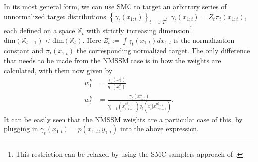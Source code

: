 In its most general form, we can use SMC to target an arbitrary
series of unnormalized target distributions $\left\{\gamma_t (x_{1:t})\right\}_{t=1:T}, \; 
\gamma_t (x_{1:t}) = Z_t \pi_t (x_{1:t})$, each defined on a space
$\mathbb{X}_t$ with strictly increasing dimension\footnote{This restriction
	can be relaxed by using the SMC samplers approach of \citet{del2006sequential}.}
$\mathrm{dim}(\mathbb{X}_{t-1})<\mathrm{dim}(\mathbb{X}_{t})$.
Here $Z_t := \int \gamma_t(x_{1:t}) dx_{1:t}$ is the normalization constant and $\pi_t (x_{1:t})$
the corresponding normalized target.  
The only difference that needs to be made from the NMSSM case is in how the weights
are calculated, with them now given by
\begin{subequations}
\label{eq:part:smc-arb-weights}
\begin{align}
w_1^k &= \frac{\gamma_1(x_1^k)}{q_1(x_1^k)} \\
w_t^k &= \frac{\gamma_t({x}_{1:t}^k)}{\gamma_{t - 1}({x}_{1:t - 1}^{a_{t - 1}^k}) q_t(x_t^i|x_{1:t-1}^{a_{t-1}^i})}.
\end{align}
\end{subequations}
It can be easily seen that the NMSSM weights are a particular case of this, by
plugging in $\gamma_t(x_{1:t}) = p(x_{1:t},y_{1:t})$ into the above expression.  


